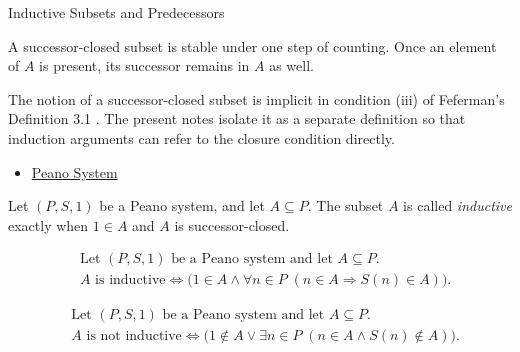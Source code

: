 \begin{topicbox}{Inductive Subsets and Predecessors}
\begin{remark*}[Interpretation]
A successor-closed subset is stable under one step of counting. Once an
element of $A$ is present, its successor remains in $A$ as well.
\end{remark*}

\begin{remark*}
The notion of a successor-closed subset is implicit in condition (iii) of
Feferman's Definition 3.1 \citep{FefermanNumberSystems1964}. The present notes
isolate it as a separate definition so that induction arguments can refer to
the closure condition directly.
\end{remark*}

\begin{remark*}[Dependencies]
\begin{itemize}
  \item \hyperref[def:peano-system]{Peano System}
\end{itemize}
\end{remark*}

\begin{tcolorbox}[colback=defbox, colframe=defborder, arc=2pt,
  left=6pt, right=6pt, top=4pt, bottom=4pt,
  title={\small\textbf{Definition (Inductive Subset of a Peano System)}} ,
  fonttitle=\small\bfseries]
\begin{definition}
\label{def:inductive-subset-of-peano-system}
Let $(P,S,1)$ be a Peano system, and let $A \subseteq P$. The subset $A$ is
called \emph{inductive} exactly when $1 \in A$ and $A$ is successor-closed.
\end{definition}
\end{tcolorbox}

\begin{remark*}
\[
\begin{aligned}
&\text{Let } (P,S,1) \text{ be a Peano system and let } A \subseteq P.\\
&A \text{ is inductive}
\Longleftrightarrow
\bigl(1 \in A \land
\forall n \in P\;(n \in A \Longrightarrow S(n) \in A)\bigr).
\end{aligned}
\]
\end{remark*}

\begin{remark*}
\[
\begin{aligned}
&\text{Let } (P,S,1) \text{ be a Peano system and let } A \subseteq P.\\
&A \text{ is not inductive}
\Longleftrightarrow
\bigl(1 \notin A \lor \exists n \in P\;(n \in A \land S(n) \notin A)\bigr).
\end{aligned}
\]
\end{remark*}


\end{topicbox}
